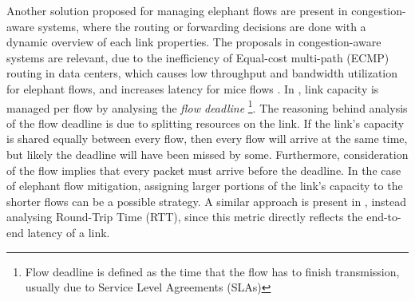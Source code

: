 \par Another solution proposed for managing elephant flows are present in congestion-aware systems, where the routing or forwarding decisions are done with a dynamic
overview of each link properties. The proposals in congestion-aware systems are relevant, due to the inefficiency of Equal-cost multi-path (ECMP) routing in data
centers, which causes low throughput and bandwidth utilization for elephant flows, and increases latency for mice flows \cite{wang_expeditus:_2017}. In 
\cite{wilson_better_2011}, link capacity is managed per flow by analysing the \textit{flow deadline} \footnote{Flow deadline is defined as the time that the flow has
to finish transmission, usually due to Service Level Agreements (SLAs)}. The reasoning behind analysis of the flow deadline is due to splitting resources on the link.
If the link's capacity is shared equally between every flow, then every flow will arrive at the same time, but likely the deadline will have been missed by some. 
Furthermore, consideration of the flow implies that every packet must arrive before the deadline. In the case of elephant flow mitigation, assigning larger portions
of the link's capacity to the shorter flows can be a possible strategy. A similar approach is present in \cite{mittal_timely:_2015}, instead analysing Round-Trip Time
(RTT), since this metric directly reflects the end-to-end latency of a link.

